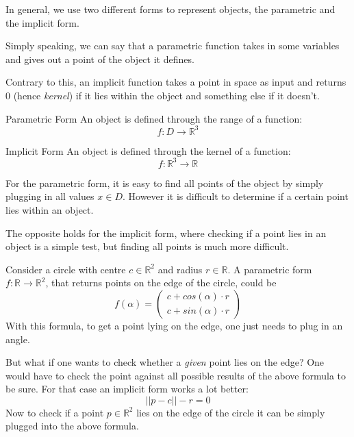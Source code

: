 \documentclass{panikzettel}
\begin{document}
\begin{halfboxl}
In general, we use two different forms to represent objects, the parametric and the implicit form.

Simply speaking, we can say that a parametric function takes in some variables and gives out a point of the object it defines.

Contrary to this, an implicit function takes a point in space as input and returns $0$ (hence \emph{kernel}) if it lies within the object and something else if it doesn't.
\end{halfboxl}%
\begin{halfboxr}
\vspace{-\baselineskip}
\begin{defi}{Parametric Form}
An object is defined through the range of a function: $$f : D \to \mathbb{R}^3 $$
\end{defi}

\begin{defi}{Implicit Form}
An object is defined through the kernel of a function: $$f: \mathbb{R}^3 \to \mathbb{R}$$
\end{defi}
\end{halfboxr}
For the parametric form, it is easy to find all points of the object by simply plugging in all values $x \in D$. However it is difficult to determine if a certain point lies within an object.

The opposite holds for the implicit form, where checking if a point lies in an object is a simple test, but finding all points is much more difficult.


Consider a circle with centre $c \in \mathbb{R}^2$ and radius $r \in \mathbb{R}$.
A parametric form $f: \mathbb{R} \to \mathbb{R}^2$, that returns points on the edge of the circle, could be
\[
    f(\alpha) = \begin{pmatrix} c + cos(\alpha) \cdot r \\ c + sin(\alpha) \cdot r \end{pmatrix}
\]
With this formula, to get a point lying on the edge, one just needs to plug in an angle.

But what if one wants to check whether a \emph{given} point lies on the edge? One would have to check the point against all possible results of the above formula to be sure. For that case an implicit form works a lot better:
\[
    ||p - c|| - r = 0
\]
Now to check if a point $p \in \mathbb{R}^2$ lies on the edge of the circle it can be simply plugged into the above formula.
\end{document}
